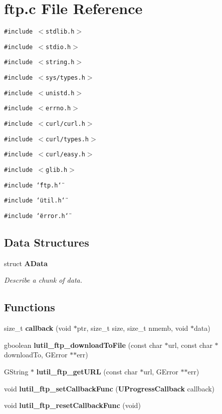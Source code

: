 \section{ftp.c File Reference}
\label{ftp_8c}
{\tt \#include $<$stdlib.h$>$}\par
{\tt \#include $<$stdio.h$>$}\par
{\tt \#include $<$string.h$>$}\par
{\tt \#include $<$sys/types.h$>$}\par
{\tt \#include $<$unistd.h$>$}\par
{\tt \#include $<$errno.h$>$}\par
{\tt \#include $<$curl/curl.h$>$}\par
{\tt \#include $<$curl/types.h$>$}\par
{\tt \#include $<$curl/easy.h$>$}\par
{\tt \#include $<$glib.h$>$}\par
{\tt \#include \char`\"{}ftp.h\char`\"{}}\par
{\tt \#include \char`\"{}util.h\char`\"{}}\par
{\tt \#include \char`\"{}error.h\char`\"{}}\par
\subsection*{Data Structures}
\begin{CompactItemize}
\item 
struct {\bf AData}
\begin{CompactList}\small\item\em Describe a chunk of data. \item\end{CompactList}\end{CompactItemize}
\subsection*{Functions}
\begin{CompactItemize}
\item 
size\_\-t {\bf callback} (void $\ast$ptr, size\_\-t size, size\_\-t nmemb, void $\ast$data)
\item 
gboolean {\bf lutil\_\-ftp\_\-download\-To\-File} (const char $\ast$url, const char $\ast$download\-To, GError $\ast$$\ast$err)
\item 
GString $\ast$ {\bf lutil\_\-ftp\_\-get\-URL} (const char $\ast$url, GError $\ast$$\ast$err)
\item 
void {\bf lutil\_\-ftp\_\-set\-Callback\-Func} ({\bf UProgress\-Callback} callback)
\item 
void {\bf lutil\_\-ftp\_\-reset\-Callback\-Func} (void)
\end{CompactItemize}
